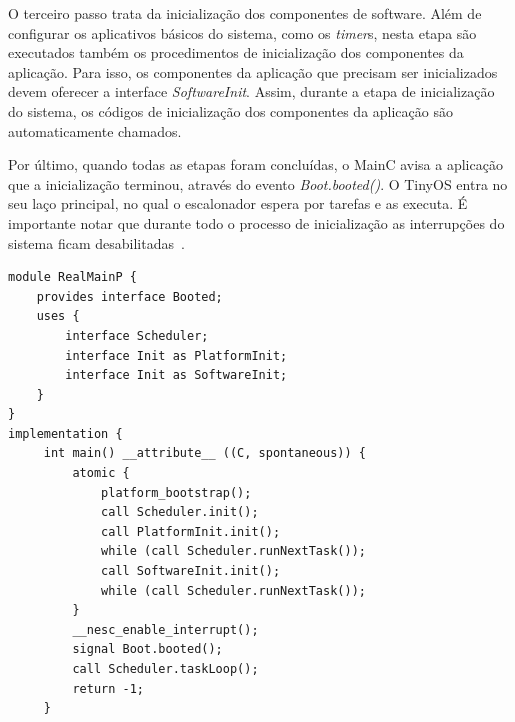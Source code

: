 O terceiro passo trata da inicialização dos componentes de software. 
Além de configurar os aplicativos básicos do sistema, como
os \textit{timer}s, nesta etapa são executados também os procedimentos de inicialização dos componentes 
da aplicação. Para isso, os componentes da aplicação que precisam ser inicializados devem oferecer a interface
{\em SoftwareInit}. Assim, durante a etapa de inicialização do sistema, os códigos de inicialização dos componentes da
aplicação são automaticamente chamados.

Por último, quando todas as etapas foram concluídas, o MainC avisa a aplicação que a inicialização terminou, através do
evento \textit{Boot.booted()}. O TinyOS entra no
seu laço principal, no qual o escalonador espera por tarefas e as executa. É importante notar que
durante todo o processo de inicialização as interrupções do sistema ficam desabilitadas~\cite{TEP107}.

\begin{lstlisting}[caption=Código de inicialização]
module RealMainP {
    provides interface Booted;
    uses {
        interface Scheduler;
        interface Init as PlatformInit;
        interface Init as SoftwareInit;
    }
}
implementation {
     int main() __attribute__ ((C, spontaneous)) {
         atomic {
             platform_bootstrap();
             call Scheduler.init();
             call PlatformInit.init();
             while (call Scheduler.runNextTask());
             call SoftwareInit.init();
             while (call Scheduler.runNextTask());
         }
         __nesc_enable_interrupt();
         signal Boot.booted();
         call Scheduler.taskLoop();
         return -1;
     }
 \end{lstlisting}

